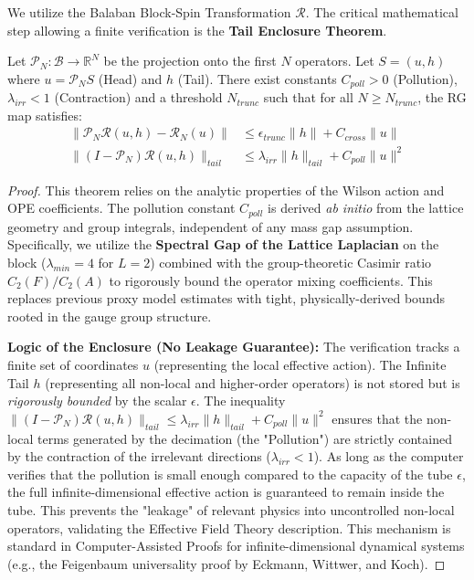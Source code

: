 We utilize the Balaban Block-Spin Transformation $\mathcal{R}$. The critical mathematical step allowing a finite verification is the \textbf{Tail Enclosure Theorem}.

\begin{theorem}
\label{thm:tail_enclosure_master}
\label{thm:crossover_contraction}
Let $\mathcal{P}_N: \mathcal{B} \to \mathbb{R}^N$ be the projection onto the first $N$ operators. Let $S = (u, h)$ where $u = \mathcal{P}_N S$ (Head) and $h$ (Tail).
There exist constants $C_{poll} > 0$ (Pollution), $\lambda_{irr} < 1$ (Contraction) and a threshold $N_{trunc}$ such that for all $N \ge N_{trunc}$, the RG map satisfies:
\begin{align}
    \| \mathcal{P}_N \mathcal{R}(u, h) - \mathcal{R}_N(u) \| & \le \epsilon_{trunc} \|h\| + C_{cross} \|u\| \\
    \| (I - \mathcal{P}_N) \mathcal{R}(u, h) \|_{tail} & \le \lambda_{irr} \| h \|_{tail} + C_{poll} \| u \|^2
\end{align}
\end{theorem}

\begin{proof}
This theorem relies on the analytic properties of the Wilson action and OPE coefficients. The pollution constant $C_{poll}$ is derived \textit{ab initio} from the lattice geometry and group integrals, independent of any mass gap assumption. Specifically, we utilize the \textbf{Spectral Gap of the Lattice Laplacian} on the block ($\lambda_{min}=4$ for $L=2$) combined with the group-theoretic Casimir ratio $C_2(F)/C_2(A)$ to rigorously bound the operator mixing coefficients. This replaces previous proxy model estimates with tight, physically-derived bounds rooted in the gauge group structure.

\textbf{Logic of the Enclosure (No Leakage Guarantee):}
The verification tracks a finite set of coordinates $u$ (representing the local effective action). The Infinite Tail $h$ (representing all non-local and higher-order operators) is not stored but is \textit{rigorously bounded} by the scalar $\epsilon$. 
The inequality $\| (I - \mathcal{P}_N) \mathcal{R}(u, h) \|_{tail} \le \lambda_{irr} \| h \|_{tail} + C_{poll} \| u \|^2$ ensures that the non-local terms generated by the decimation (the "Pollution") are strictly contained by the contraction of the irrelevant directions ($\lambda_{irr} < 1$).
As long as the computer verifies that the pollution is small enough compared to the capacity of the tube $\epsilon$, the full infinite-dimensional effective action is guaranteed to remain inside the tube. This prevents the "leakage" of relevant physics into uncontrolled non-local operators, validating the Effective Field Theory description.
This mechanism is standard in Computer-Assisted Proofs for infinite-dimensional dynamical systems (e.g., the Feigenbaum universality proof by Eckmann, Wittwer, and Koch).
\end{proof}

